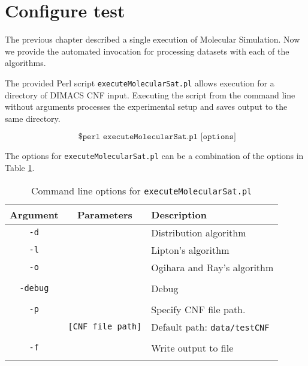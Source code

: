 	\section{Configure test}


The previous chapter described a single execution of Molecular Simulation.  Now we provide the automated invocation for processing datasets with each of the algorithms.

The provided Perl script \texttt{executeMolecularSat.pl} allows execution for a directory of DIMACS CNF input.  Executing the script from the command line without arguments processes the experimental setup and saves output to the same directory.

\[
\texttt{ \$ perl executeMolecularSat.pl [options]}
\]

The options for \texttt{executeMolecularSat.pl} can be a combination of the options in Table \ref{executeMolecularSatTable}.




\begin{table}[htdp]
\caption{Command line options for \texttt{executeMolecularSat.pl}}
\begin{center}
\begin{tabular}{|c|c|l|}
\hline
\textbf{Argument} & \textbf{Parameters} & \textbf{Description} \\ \hline
 \texttt{-d}	& 				   & Distribution algorithm		 \\
 \texttt{-l}	& 				   & Lipton's algorithm		 \\
 \texttt{-o}	& 				   & Ogihara and Ray's algorithm		 \\
 				&				   &		 \\ \hline 				
\texttt{-debug}		&				   & Debug		 \\ 				
 				&				   &		 \\ \hline
\texttt{-p}		&				   & Specify CNF file path. 	 \\
 				& \texttt{[CNF file path]}  &		Default path: \texttt{data/testCNF}	 \\ 			
 				&				   &		\\ \hline 	
\texttt{-f}		&				   & Write output to file		 \\
 				&				   &		\\ \hline 				
\end{tabular}
\end{center}
\label{executeMolecularSatTable}
\end{table}%

